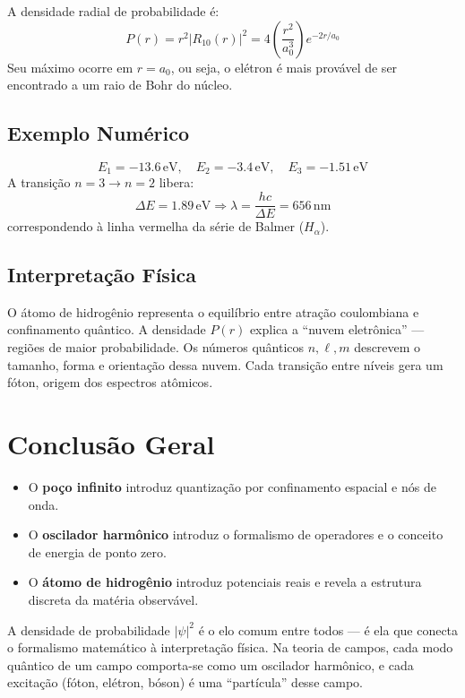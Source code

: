 \documentclass[12pt,a4paper]{article}
\begin{document}
A densidade radial de probabilidade é:
\[
P(r)=r^2|R_{10}(r)|^2 = 4\left(\frac{r^2}{a_0^3}\right)e^{-2r/a_0}
\]
Seu máximo ocorre em \(r=a_0\), ou seja, o elétron é mais provável de ser encontrado a um raio de Bohr do núcleo.

\subsection*{Exemplo Numérico}

\[
E_1=-13.6\,\mathrm{eV}, \quad E_2=-3.4\,\mathrm{eV}, \quad E_3=-1.51\,\mathrm{eV}
\]
A transição \(n=3 \to n=2\) libera:
\[
\Delta E = 1.89\,\mathrm{eV} \Rightarrow \lambda = \frac{hc}{\Delta E} = 656\,\mathrm{nm}
\]
correspondendo à linha vermelha da série de Balmer (\(H_\alpha\)).

\subsection*{Interpretação Física}

O átomo de hidrogênio representa o equilíbrio entre atração coulombiana e confinamento quântico.  
A densidade \(P(r)\) explica a “nuvem eletrônica” — regiões de maior probabilidade.  
Os números quânticos \(n,\ell,m\) descrevem o tamanho, forma e orientação dessa nuvem.  
Cada transição entre níveis gera um fóton, origem dos espectros atômicos.


\section{Conclusão Geral}

\begin{itemize}
\item O \textbf{poço infinito} introduz quantização por confinamento espacial e nós de onda.  
\item O \textbf{oscilador harmônico} introduz o formalismo de operadores e o conceito de energia de ponto zero.  
\item O \textbf{átomo de hidrogênio} introduz potenciais reais e revela a estrutura discreta da matéria observável.  
\end{itemize}

A densidade de probabilidade \(|\psi|^2\) é o elo comum entre todos — é ela que conecta o formalismo matemático à interpretação física.  
Na teoria de campos, cada modo quântico de um campo comporta-se como um oscilador harmônico, e cada excitação (fóton, elétron, bóson) é uma “partícula” desse campo.
\end{document}
